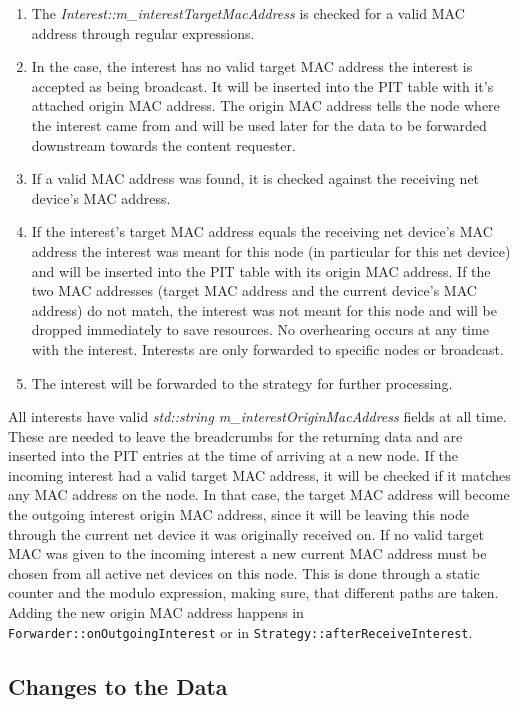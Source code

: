 \begin{enumerate}
\item The \emph{Interest::m\_interestTargetMacAddress} is checked for a valid MAC address through regular expressions.
\item In the case, the interest has no valid target MAC address the interest is accepted as being broadcast. It will be inserted into the PIT table with it's attached origin MAC address. The origin MAC address tells the node where the interest came from and will be used later for the data to be forwarded downstream towards the content requester.
\item If a valid MAC address was found, it is checked against the receiving net device's MAC address.
\item If the interest's target MAC address equals the receiving net device's MAC address the interest was meant for this node (in particular for this net device) and will be inserted into the PIT table with its origin MAC address. If the two MAC addresses (target MAC address and the current device's MAC address) do not match, the interest was not meant for this node and will be dropped immediately to save resources. No overhearing occurs at any time with the interest. Interests are only forwarded to specific nodes or broadcast.
\item The interest will be forwarded to the strategy for further processing.
\end{enumerate}

All interests have valid \emph{std::string m\_interestOriginMacAddress} fields at all time. These are needed to leave the breadcrumbs for the returning data and are inserted into the PIT entries at the time of arriving at a new node. If the incoming interest had a valid target MAC address, it will be checked if it matches any MAC address on the node. In that case, the target MAC address will become the outgoing interest origin MAC address, since it will be leaving this node through the current net device it was originally received on. If no valid target MAC was given to the incoming interest a new current MAC address must be chosen from all active net devices on this node. This is done through a static counter and the modulo expression, making sure, that different paths are taken. Adding the new origin MAC address happens in \texttt{Forwarder::onOutgoingInterest} or in \texttt{Strategy::afterReceiveInterest}.

\subsection{Changes to the Data}

